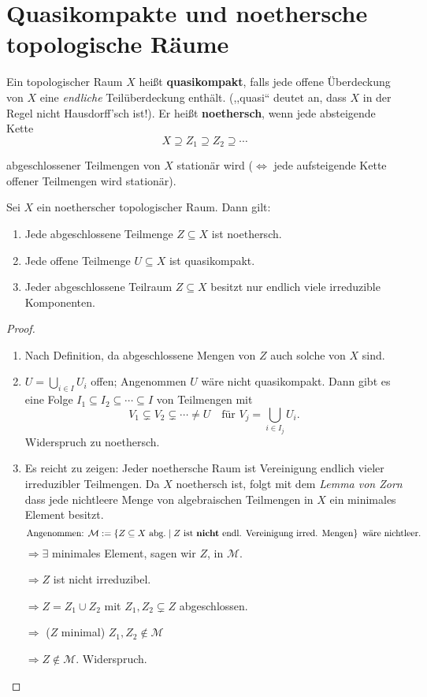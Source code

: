 
\section{Quasikompakte und noethersche topologische Räume}
\label{sec:quasikompakt-noethersch}
\begin{defn}
  \label{def:quasikompakt/noethersch}
  Ein topologischer Raum $X$ heißt \textbf{quasikompakt},
  falls jede offene Überdeckung von $X$ eine \emph{endliche} Teilüberdeckung
  enthält. (,,quasi`` deutet an, dass $X$ in der Regel nicht Hausdorff'sch
  ist!). Er heißt \textbf{noethersch}, wenn jede
  absteigende Kette
  \[
    X\supseteq Z_{1}\supseteq Z_{2}\supseteq\cdots
  \]

  abgeschlossener Teilmengen von $X$ stationär wird ($\Leftrightarrow$
  jede aufsteigende Kette offener Teilmengen wird stationär).
\end{defn}
\begin{lem}
  \label{lem:eigenschaften-noethersch}
  Sei $X$ ein noetherscher topologischer Raum. Dann gilt:
  \begin{enumerate}
  \item Jede abgeschlossene Teilmenge $Z \subseteq X$ ist noethersch.
  \item Jede offene Teilmenge $U \subseteq X$ ist quasikompakt.
  \item Jeder abgeschlossene Teilraum $Z \subseteq X$ besitzt nur endlich viele
    irreduzible Komponenten.
  \end{enumerate}
\end{lem}
\begin{proof}
  \mbox{}
  \begin{enumerate}
  \item Nach Definition, da abgeschlossene Mengen von $Z$ auch solche von
    $X$ sind.
  \item $U=\bigcup_{i\in I}U_{i}$ offen; Angenommen $U$ wäre nicht quasikompakt.
    Dann gibt es eine Folge $I_{1}\subseteq I_{2}\subseteq\cdots\subseteq I$ von Teilmengen
    mit
    \[
      V_{1}\subsetneq V_{2}\subsetneq\cdots\neq U\quad\text{für }V_{j}=\bigcup_{i\in I_{j}}U_{i}.
    \]
    Widerspruch zu noethersch.
  \item Es reicht zu zeigen: Jeder noethersche Raum ist Vereinigung endlich
    vieler irreduzibler Teilmengen. Da $X$ noethersch ist, folgt mit
    dem \emph{Lemma von Zorn} dass jede nichtleere Menge von algebraischen
    Teilmengen in $X$ ein minimales Element besitzt. 
    \[
      \text{Angenommen: } \mathcal{M}:=\left\{ Z\subseteq X\text{ abg.}\mid Z\text{ ist \textbf{nicht} endl. Vereinigung irred. Mengen}\right\} \text{ wäre nichtleer.}
    \]
    $\Rightarrow\exists$ minimales Element, sagen wir $Z$, in $\mathcal{M}$.

    $\Rightarrow Z$ ist nicht irreduzibel.

    $\Rightarrow Z=Z_{1}\cup Z_{2}$ mit $Z_{1},Z_{2}\subsetneq Z$ abgeschlossen.

    $\Rightarrow$ ($Z$ minimal) $Z_{1},Z_{2}\notin\mathcal{M}$

    $\Rightarrow Z\notin\mathcal{M}$. Widerspruch.

  \end{enumerate}
\end{proof}
